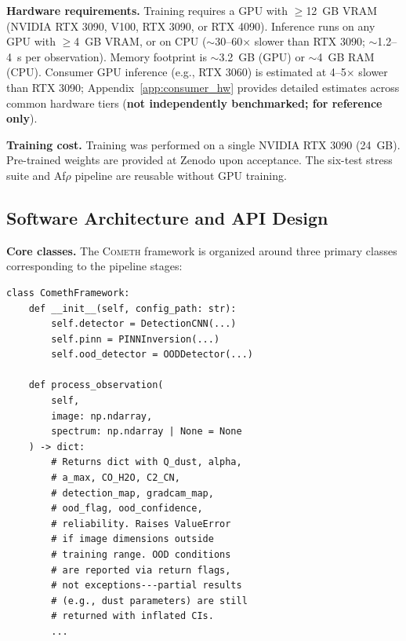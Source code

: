 \documentclass[usenatbib]{mnras}
\begin{document}
\textbf{Hardware requirements.} Training requires a GPU with $\geq$12~GB VRAM (NVIDIA RTX 3090, V100, RTX 3090, or RTX 4090). Inference runs on any GPU with $\geq$4~GB VRAM, or on CPU ($\sim$30--60$\times$ slower than RTX 3090; $\sim$1.2--4~s per observation). Memory footprint is $\sim$3.2~GB (GPU) or $\sim$4~GB RAM (CPU). Consumer GPU inference (e.g., RTX 3060) is estimated at 4--5$\times$ slower than RTX 3090; Appendix~\ref{app:consumer_hw} provides detailed estimates across common hardware tiers (\textbf{not independently benchmarked; for reference only}).

\textbf{Training cost.} Training was performed on a single NVIDIA RTX 3090 (24~GB). Pre-trained weights are provided at Zenodo upon acceptance. The six-test stress suite and Af$\rho$ pipeline are reusable without GPU training.

\subsection{Software Architecture and API Design}\label{sec:api}

\textbf{Core classes.} The \textsc{Cometh} framework is organized around three primary classes corresponding to the pipeline stages:

{\footnotesize
\begin{verbatim}
class ComethFramework:
    def __init__(self, config_path: str):
        self.detector = DetectionCNN(...)
        self.pinn = PINNInversion(...)
        self.ood_detector = OODDetector(...)

    def process_observation(
        self,
        image: np.ndarray,
        spectrum: np.ndarray | None = None
    ) -> dict:
        # Returns dict with Q_dust, alpha,
        # a_max, CO_H2O, C2_CN,
        # detection_map, gradcam_map,
        # ood_flag, ood_confidence,
        # reliability. Raises ValueError
        # if image dimensions outside
        # training range. OOD conditions
        # are reported via return flags,
        # not exceptions---partial results
        # (e.g., dust parameters) are still
        # returned with inflated CIs.
        ...
\end{verbatim}
}
\end{document}
